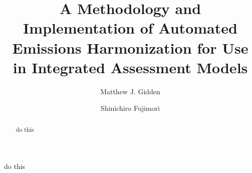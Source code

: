 

\begin{frontmatter}

\title{A Methodology and Implementation of Automated Emissions Harmonization for Use in Integrated Assessment Models}

\author[iiasa]{Matthew J. Gidden}
\author[iiasa, nies]{Shinichiro Fujimori}
\address[iiasa]{International Institute for Applied Systems Analysis,
  Schlossplatz 1, A-2361 Laxenburg, Austria}
\address[nies]{National Institute for Environmental Studies, Tsukuba, Japan}

\begin{abstract}
\TODO do this \cite{Dirac1953888}
\end{abstract}

\begin{keyword}
\TODO do this
\end{keyword}

\end{frontmatter}

\linenumbers
